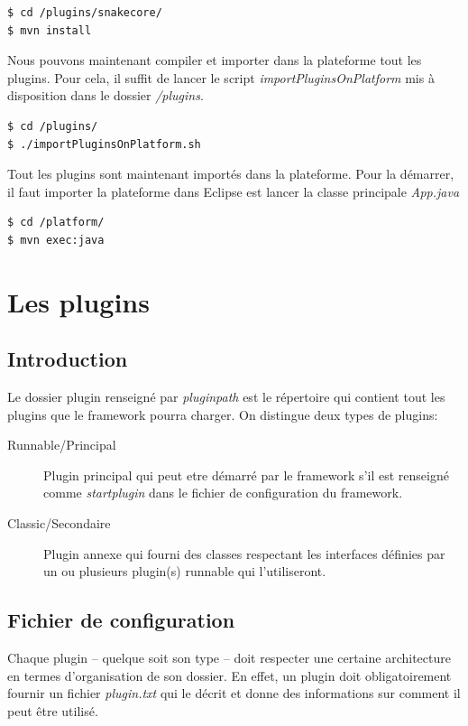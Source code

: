 \documentclass[12pt,a4paper]{article}
\begin{document}
\begin{lstlisting}[language=bash,caption=Installation des plugins principaux]
$ cd /plugins/snakecore/
$ mvn install
\end{lstlisting}

Nous pouvons maintenant compiler et importer dans la plateforme tout les plugins. 
Pour cela, il suffit de lancer le script \emph{importPluginsOnPlatform} mis à 
disposition dans le dossier \emph{/plugins}.

\begin{lstlisting}[language=bash,caption=Importer les plugins]
$ cd /plugins/
$ ./importPluginsOnPlatform.sh
\end{lstlisting}

Tout les plugins sont maintenant importés dans la plateforme. Pour la démarrer, il 
faut importer la plateforme dans Eclipse est lancer la classe principale \emph{App.java}

\begin{lstlisting}[language=bash,caption=Démarrer la plateforme]
$ cd /platform/
$ mvn exec:java
\end{lstlisting}

\section{Les plugins}
\subsection{Introduction}
Le dossier plugin renseigné par \emph{pluginpath} est le répertoire qui contient 
tout les plugins que le framework pourra charger. On distingue deux types de 
plugins:

\begin{description}
	\item[Runnable/Principal] Plugin principal qui peut etre démarré par le framework s'il 
	est renseigné comme \emph{startplugin} dans le fichier de configuration du 
	framework.
	
	\item[Classic/Secondaire] Plugin annexe qui fourni des classes respectant les interfaces 
	définies par un ou plusieurs plugin(s) runnable qui l'utiliseront.
\end{description}

\subsection{Fichier de configuration}
Chaque plugin -- quelque soit son type -- doit respecter une certaine architecture 
en termes d'organisation de son dossier. En effet, un plugin doit obligatoirement 
fournir un fichier \emph{plugin.txt} qui le décrit et donne des informations sur 
comment il peut être utilisé.
\end{document}
